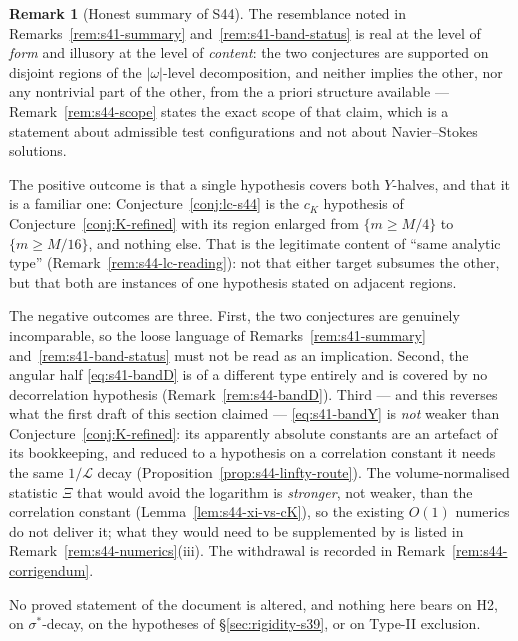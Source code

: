 \documentclass[11pt]{article}
\theoremstyle{definition}
\newtheorem{remark}[theorem]{Remark}
\theoremstyle{remark}
\begin{document}
\begin{remark}[Honest summary of S44]\label{rem:s44-summary}
  The resemblance noted in Remarks~\ref{rem:s41-summary}
  and~\ref{rem:s41-band-status} is real at the level of \emph{form} and
  illusory at the level of \emph{content}: the two conjectures are supported
  on disjoint regions of the $|\omega|$-level decomposition, and neither
  implies the other, nor any nontrivial part of the other, from the a priori
  structure available --- Remark~\ref{rem:s44-scope} states the exact scope of
  that claim, which is a statement about admissible test configurations and
  not about Navier--Stokes solutions.

  The positive outcome is that a single hypothesis covers both $Y$-halves, and
  that it is a familiar one: Conjecture~\ref{conj:lc-s44} is the $c_K$
  hypothesis of Conjecture~\ref{conj:K-refined} with its region enlarged from
  $\{m\geq M/4\}$ to $\{m\geq M/16\}$, and nothing else. That is the
  legitimate content of ``same analytic type''
  (Remark~\ref{rem:s44-lc-reading}): not that either target subsumes the
  other, but that both are instances of one hypothesis stated on adjacent
  regions.

  The negative outcomes are three. First, the two conjectures are genuinely
  incomparable, so the loose language of
  Remarks~\ref{rem:s41-summary} and~\ref{rem:s41-band-status} must not be read
  as an implication. Second, the angular half \eqref{eq:s41-bandD} is of a
  different type entirely and is covered by no decorrelation hypothesis
  (Remark~\ref{rem:s44-bandD}). Third --- and this reverses what the first
  draft of this section claimed --- \eqref{eq:s41-bandY} is \emph{not} weaker
  than Conjecture~\ref{conj:K-refined}: its apparently absolute constants are
  an artefact of its bookkeeping, and reduced to a hypothesis on a correlation
  constant it needs the same $1/\mathcal{L}$ decay
  (Proposition~\ref{prop:s44-linfty-route}). The volume-normalised statistic
  $\Xi$ that would avoid the logarithm is \emph{stronger}, not weaker, than
  the correlation constant (Lemma~\ref{lem:s44-xi-vs-cK}), so the existing
  $O(1)$ numerics do not deliver it; what they would need to be supplemented
  by is listed in Remark~\ref{rem:s44-numerics}(iii). The withdrawal is
  recorded in Remark~\ref{rem:s44-corrigendum}.

  No proved statement of the document is altered, and nothing here bears on
  H2, on $\sigma^*$-decay, on the hypotheses of \S\ref{sec:rigidity-s39}, or
  on Type-II exclusion.
\end{remark}
\end{document}
